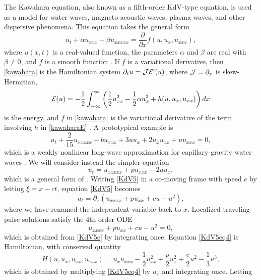 \documentclass[10pt,reqno]{amsart}
\theoremstyle{plain}
\theoremstyle{definition}
\theoremstyle{remark}
\numberwithin{theorem}{section}
\numberwithin{equation}{section}
\begin{document}
The Kawahara equation, also known as a fifth-order KdV-type equation, is used as a model for water waves, magneto-acoustic waves, plasma waves, and other dispersive phenomena. This equation takes the general form
\begin{equation}\label{kawahara}
u_t + \alpha u_{xxx} + \beta u_{xxxxx} = \frac{\partial}{\partial x} f(u, u_x, u_{xxx}),
\end{equation}
where $u(x, t)$ is a real-valued function, the parameters $\alpha$ and $\beta$ are real with $\beta \neq 0$, and $f$ is a smooth function \cite{Bridges2002,Bridges2002a}. If $f$ is a variational derivative, then \cref{kawahara} is the Hamiltonian system $\partial_t u = \mathcal{J} \mathcal{E}'(u)$, where $\mathcal{J} = \partial_x$ is skew-Hermitian,
\begin{equation}\label{kawaharaE}
\mathcal{E}(u) = -\frac{1}{2}\int_{-\infty}^\infty 
\left( \frac{1}{2}u_{xx}^2 - \frac{1}{2}\alpha u_x^2 + h(u, u_x, u_{xx})\right)dx
\end{equation}
is the energy, and $f$ in \cref{kawahara} is the variational derivative of the term involving $h$ in \cref{kawaharaE} \cite{Bridges2002}. A prototypical example is
\[
u_t + \frac{2}{15}u_{xxxxx} - b u_{xxx} + 3 u u_x + 2 u_x u_{xx} + u u_{xxx} = 0,
\]
which is a weakly nonlinear long-wave approximation for capillary-gravity water waves \cite{Champneys1998,Champneys1997}. We will consider instead the simpler equation 
\begin{equation}\label{KdV5}
u_t = u_{xxxxx} + p u_{xxx} - 2 u u_x,
\end{equation}
which is a general form of \cite[(1)]{Pelinovsky2007}. Writing \cref{KdV5} in a co-moving frame with speed $c$ by letting $\xi = x - ct$, equation \cref{KdV5} becomes
\begin{equation}\label{KdV5c}
u_t = \partial_x(u_{xxxx} + p u_{xx} + cu - u^2),
\end{equation}
where we have renamed the independent variable back to $x$. Localized traveling pulse solutions satisfy the 4th order ODE
\begin{equation}\label{KdV5eq4}
u_{xxxx} + p u_{xx} + c u - u^2 = 0,
\end{equation}
which is obtained from \cref{KdV5c} by integrating once. Equation \cref{KdV5eq4} is Hamiltonian, with conserved quantity
\begin{equation}\label{KdV5ham}
H(u, u_x, u_{xx}, u_{xxx}) = u_x u_{xxx} - \frac{1}{2}u_{xx}^2 + \frac{p}{2}u_x^2 + \frac{c}{2}u^2 - \frac{1}{3}u^3,
\end{equation}
which is obtained by multiplying \cref{KdV5eq4} by $u_x$ and integrating once. Letting
\end{document}
